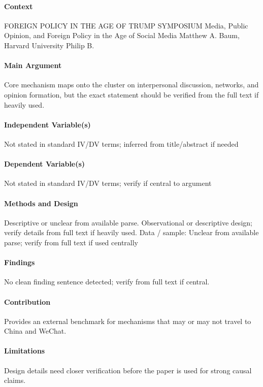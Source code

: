 \documentclass[12pt]{article}
\begin{document}
\paragraph{Context} FOREIGN POLICY IN THE AGE OF TRUMP SYMPOSIUM Media, Public Opinion, and Foreign Policy in the Age of Social Media Matthew A. Baum, Harvard University Philip B.

\paragraph{Main Argument} Core mechanism maps onto the cluster on interpersonal discussion, networks, and opinion formation, but the exact statement should be verified from the full text if heavily used.

\paragraph{Independent Variable(s)} Not stated in standard IV/DV terms; inferred from title/abstract if needed

\paragraph{Dependent Variable(s)} Not stated in standard IV/DV terms; verify if central to argument

\paragraph{Methods and Design} Descriptive or unclear from available parse. Observational or descriptive design; verify details from full text if heavily used. Data / sample: Unclear from available parse; verify from full text if used centrally

\paragraph{Findings} No clean finding sentence detected; verify from full text if central.

\paragraph{Contribution} Provides an external benchmark for mechanisms that may or may not travel to China and WeChat.

\paragraph{Limitations} Design details need closer verification before the paper is used for strong causal claims.
\end{document}
